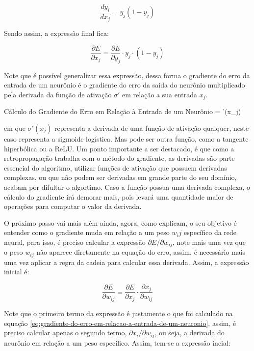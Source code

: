 \[
    \frac{d y_i}{d x_j} = y_j (1 - y_j)
\]

Sendo assim, a expressão final fica:

\[
    \frac{\partial E}{\partial x_j} = \frac{\partial E}{\partial y_j} \cdot y_j \cdot (1 - y_j)
\]

Note que é possível generalizar essa expressão, dessa forma o gradiente do erro da entrada de um neurônio é o gradiente do erro da saída do neurônio multiplicado pela derivada da função de ativação $\sigma'$ em relação a sua entrada $x_j$.

\begin{equacaodestaque}{Cálculo do Gradiente do Erro em Relação à Entrada de um Neurônio}
     =  \cdot \sigma'(x_j)
    \label{eq:gradiente-do-erro-em-relacao-a-entrada-de-um-neuronio}
\end{equacaodestaque}

em que $\sigma'(x_j)$ representa a derivada de uma função de ativação qualquer, neste caso representa a sigmoide logística. Mas pode ser outra função, como a tangente hiperbólica ou a ReLU. Um ponto importante a ser destacado, é que como a retropropagação trabalha com o método do gradiente, as derivadas são parte essencial do algoritmo, utilizar funções de ativação que possuem derivadas complexas, ou que não podem ser derivadas em grande parte do seu domínio, acabam por difultar o algortimo. Caso a função possua uma derivada complexa, o cálculo do gradiente irá demorar mais, pois levará uma quantidade maior de operações para computar o valor da derivada.

O próximo passo vai mais além ainda, agora, como \textcite{BackpropagationArticle} explicam, o seu objetivo é entender como o gradiente muda em relação a um peso $w_ij$ específico da rede neural, para isso, é preciso calcular a expressão $\partial E / \partial w_{ij}$, note mais uma vez que o peso $w_{ij}$ não aparece diretamente na equação do erro, assim, é necessário mais uma vez aplicar a regra da cadeia para calcular essa derivada. Assim, a expressão inicial é:

\[
    \frac{\partial E}{\partial w_{ij}} = \frac{\partial E}{\partial x_j} \cdot \frac{\partial x_j}{\partial w_{ij}}
\]

Note que o primeiro termo da expressão é justamente o que foi calculado na equação \ref{eq:gradiente-do-erro-em-relacao-a-entrada-de-um-neuronio}, assim, é preciso calcular apenas o segundo termo, $\partial x_i / \partial w_{ij}$, ou seja, a derivada do neurônio em relação a um peso específico. Assim, tem-se a expressão incial:

